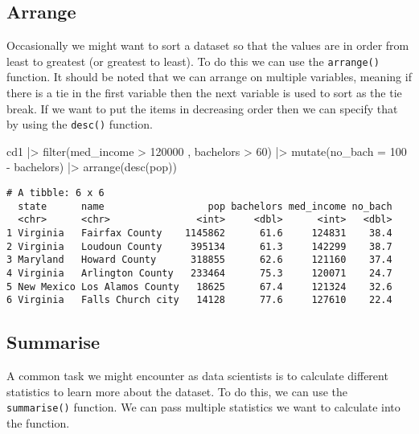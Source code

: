 \documentclass[
  letterpaper,
  DIV=11,
  numbers=noendperiod]{scrreprt}
\newenvironment{Shaded}{\begin{snugshade}}{\end{snugshade}}
\newcommand{\AttributeTok}[1]{\textcolor[rgb]{0.40,0.45,0.13}{#1}}
\newcommand{\DecValTok}[1]{\textcolor[rgb]{0.68,0.00,0.00}{#1}}
\newcommand{\FunctionTok}[1]{\textcolor[rgb]{0.28,0.35,0.67}{#1}}
\newcommand{\NormalTok}[1]{\textcolor[rgb]{0.00,0.23,0.31}{#1}}
\newcommand{\SpecialCharTok}[1]{\textcolor[rgb]{0.37,0.37,0.37}{#1}}
\begin{document}
\subsection{Arrange}\label{arrange}

Occasionally we might want to sort a dataset so that the values are in
order from least to greatest (or greatest to least). To do this we can
use the \texttt{arrange()} function. It should be noted that we can
arrange on multiple variables, meaning if there is a tie in the first
variable then the next variable is used to sort as the tie break. If we
want to put the items in decreasing order then we can specify that by
using the \texttt{desc()} function.

\begin{Shaded}
\begin{Highlighting}[]
\NormalTok{cd1 }\SpecialCharTok{|\textgreater{}} \FunctionTok{filter}\NormalTok{(med\_income }\SpecialCharTok{\textgreater{}} \DecValTok{120000}\NormalTok{ , bachelors }\SpecialCharTok{\textgreater{}} \DecValTok{60}\NormalTok{) }\SpecialCharTok{|\textgreater{}}
    \FunctionTok{mutate}\NormalTok{(}\AttributeTok{no\_bach =} \DecValTok{100} \SpecialCharTok{{-}}\NormalTok{ bachelors) }\SpecialCharTok{|\textgreater{}}
    \FunctionTok{arrange}\NormalTok{(}\FunctionTok{desc}\NormalTok{(pop))}
\end{Highlighting}
\end{Shaded}

\begin{verbatim}
# A tibble: 6 x 6
  state      name                  pop bachelors med_income no_bach
  <chr>      <chr>               <int>     <dbl>      <int>   <dbl>
1 Virginia   Fairfax County    1145862      61.6     124831    38.4
2 Virginia   Loudoun County     395134      61.3     142299    38.7
3 Maryland   Howard County      318855      62.6     121160    37.4
4 Virginia   Arlington County   233464      75.3     120071    24.7
5 New Mexico Los Alamos County   18625      67.4     121324    32.6
6 Virginia   Falls Church city   14128      77.6     127610    22.4
\end{verbatim}

\subsection{Summarise}\label{summarise}

A common task we might encounter as data scientists is to calculate
different statistics to learn more about the dataset. To do this, we can
use the \texttt{summarise()} function. We can pass multiple statistics
we want to calculate into the function.
\end{document}
